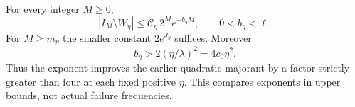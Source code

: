 \begin{proposition}
\label{prop:Shaik-full-entropy}
For every integer \(M\ge0\),
\begin{equation}\label{eq:Shaik-full-entropy-shell}
 |I_M\setminus W_\eta|
 \le \mathcal C_\eta\,2^M e^{-b_\eta M},
 \qquad 0<b_\eta<\ell .
\end{equation}
For \(M\ge m_\eta\) the smaller constant \(2e^{J_\eta}\) suffices.
Moreover
\begin{equation}\label{eq:Shaik-entropy-quadratic-comparison}
 b_\eta>2(\eta/\lambda)^2=4c_0\eta^2 .
\end{equation}
Thus the exponent improves the earlier quadratic majorant by a factor
strictly greater than four at each fixed positive \(\eta\).
This compares exponents in upper bounds, not actual failure frequencies.
\end{proposition}
